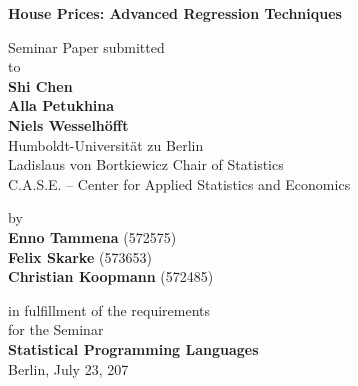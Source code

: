 \begin{center}

    {\Large{\bf House Prices: Advanced Regression Techniques}} \vspace{0.5cm}


    {\normalsize Seminar Paper submitted\\\vspace{0.5cm}
    to}\\\vspace{0.5cm}
    {\normalsize{\bf Shi Chen \\Alla Petukhina \\Niels Wesselhöfft}} \\\vspace{0.5cm}
    {\normalsize Humboldt-Universit\"at zu Berlin \\
    Ladislaus von Bortkiewicz Chair of Statistics \\
    C.A.S.E. – Center for Applied Statistics
and Economics} \vspace{1cm}


    {\normalsize by \\\vspace{0.5cm}
    {\bf Enno Tammena}
    (572575)}\\
    {\normalsize
    {\bf Felix Skarke}
    (573653)}\\
    {\normalsize
    {\bf Christian Koopmann}
    (572485)}\vspace{1cm}


    {\normalsize in fulfillment of the requirements  \\
    for the Seminar \\
    {\bf Statistical Programming Languages} \\
    Berlin, July 23, 207}

\end{center}
